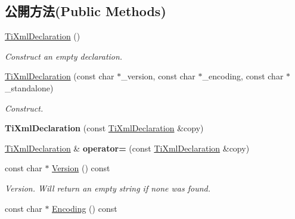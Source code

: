 \subsection*{公開方法(Public Methods)}
\begin{DoxyCompactItemize}
\item 
\hyperlink{class_ti_xml_declaration_aa0484d059bea0ea1acb47c9094382d79}{Ti\+Xml\+Declaration} ()\hypertarget{class_ti_xml_declaration_aa0484d059bea0ea1acb47c9094382d79}{}\label{class_ti_xml_declaration_aa0484d059bea0ea1acb47c9094382d79}

\begin{DoxyCompactList}\small\item\em Construct an empty declaration. \end{DoxyCompactList}\item 
\hyperlink{class_ti_xml_declaration_a3b618d1c30c25e4b7a71f31a595ee298}{Ti\+Xml\+Declaration} (const char $\ast$\+\_\+version, const char $\ast$\+\_\+encoding, const char $\ast$\+\_\+standalone)\hypertarget{class_ti_xml_declaration_a3b618d1c30c25e4b7a71f31a595ee298}{}\label{class_ti_xml_declaration_a3b618d1c30c25e4b7a71f31a595ee298}

\begin{DoxyCompactList}\small\item\em Construct. \end{DoxyCompactList}\item 
{\bfseries Ti\+Xml\+Declaration} (const \hyperlink{class_ti_xml_declaration}{Ti\+Xml\+Declaration} \&copy)\hypertarget{class_ti_xml_declaration_a58ac9042c342f7845c8491da0bb091e8}{}\label{class_ti_xml_declaration_a58ac9042c342f7845c8491da0bb091e8}

\item 
\hyperlink{class_ti_xml_declaration}{Ti\+Xml\+Declaration} \& {\bfseries operator=} (const \hyperlink{class_ti_xml_declaration}{Ti\+Xml\+Declaration} \&copy)\hypertarget{class_ti_xml_declaration_a3bc617efe11014ff2b1a9c5727c37a9a}{}\label{class_ti_xml_declaration_a3bc617efe11014ff2b1a9c5727c37a9a}

\item 
const char $\ast$ \hyperlink{class_ti_xml_declaration_a02ee557b1a4545c3219ed377c103ec76}{Version} () const \hypertarget{class_ti_xml_declaration_a02ee557b1a4545c3219ed377c103ec76}{}\label{class_ti_xml_declaration_a02ee557b1a4545c3219ed377c103ec76}

\begin{DoxyCompactList}\small\item\em Version. Will return an empty string if none was found. \end{DoxyCompactList}\item 
const char $\ast$ \hyperlink{class_ti_xml_declaration_a5d974231f9e9a2f0542f15f3a46cdb76}{Encoding} () const \hypertarget{class_ti_xml_declaration_a5d974231f9e9a2f0542f15f3a46cdb76}{}\label{class_ti_xml_declaration_a5d974231f9e9a2f0542f15f3a46cdb76}


\end{DoxyCompactItemize}
